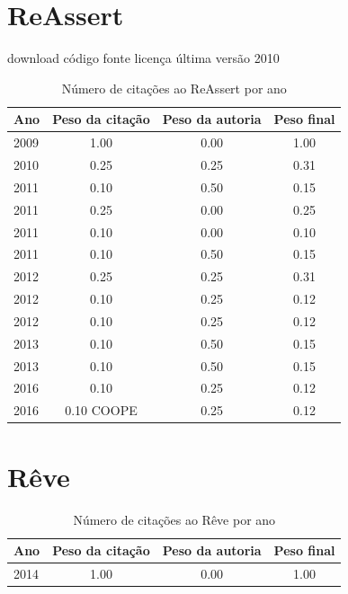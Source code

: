 \section{ReAssert}
\checkmark download
\checkmark código fonte
\checkmark licença
\checkmark última versão 2010
\begin{table}[H]
\caption{Número de citações ao ReAssert por ano}
\centering
\begin{tabular}{| l | c | c | c |}
  \hline
  Ano & Peso da citação & Peso da autoria & Peso final \\
  \hline
  2009
    & 1.00
    & 0.00
    & {\color{blue} 1.00} \\
\hline
  2010
    & 0.25
    & 0.25
    & {\color{red} 0.31} \\
\hline
  2011
    & 0.10
    & 0.50
    & {\color{red} 0.15} \\
  2011
    & 0.25
    & 0.00
    & {\color{red} 0.25} \\
  2011
    & 0.10
    & 0.00
    & {\color{red} 0.10} \\
  2011
    & 0.10
    & 0.50
    & {\color{red} 0.15} \\
\hline
  2012
    & 0.25
    & 0.25
    & {\color{red} 0.31} \\
  2012
    & 0.10
    & 0.25
    & {\color{red} 0.12} \\
  2012
    & 0.10
    & 0.25
    & {\color{red} 0.12} \\
\hline
  2013
    & 0.10
    & 0.50
    & {\color{red} 0.15} \\
  2013
    & 0.10
    & 0.50
    & {\color{red} 0.15} \\
\hline
  2016
    & 0.10
    & 0.25
    & {\color{red} 0.12} \\
  2016
    & 0.10
          {\tiny COOPE}
    & 0.25
    & {\color{red} 0.12} \\
\hline
\end{tabular}
\end{table}
\section{Rêve}
\begin{table}[H]
\caption{Número de citações ao Rêve por ano}
\centering
\begin{tabular}{| l | c | c | c |}
  \hline
  Ano & Peso da citação & Peso da autoria & Peso final \\
  \hline
  2014
    & 1.00
    & 0.00
    & {\color{blue} 1.00} \\
\hline
\end{tabular}
\end{table}

